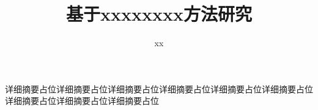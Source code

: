\documentclass[
				oneside, 
				nocpsupervisor, 
				academic %
				]{theme/hduthesis}
\title{基于xxxxxxxx方法研究}{基于xxxxxxxx方法研究}{}
\author{xx}%
\institute{xxxxxx}    %
\begin{document}
\makeDetailAbstracttitle


\mainmatter
详细摘要占位详细摘要占位详细摘要占位详细摘要占位详细摘要占位详细摘要占位详细摘要占位详细摘要占位详细摘要占位
\end{document}
